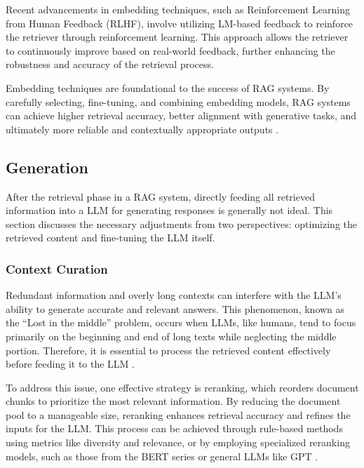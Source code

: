 Recent advancements in embedding techniques, such as Reinforcement Learning from Human Feedback (RLHF), involve utilizing LM-based feedback to reinforce the retriever through reinforcement learning. This approach allows the retriever to continuously improve based on real-world feedback, further enhancing the robustness and accuracy of the retrieval process.

Embedding techniques are foundational to the success of RAG systems. By carefully selecting, fine-tuning, and combining embedding models, RAG systems can achieve higher retrieval accuracy, better alignment with generative tasks, and ultimately more reliable and contextually appropriate outputs \cite{gao2023retrieval}.

\subsection{Generation}

After the retrieval phase in a RAG system, directly feeding all retrieved information into a LLM for generating responses is generally not ideal. This section discusses the necessary adjustments from two perspectives: optimizing the retrieved content and fine-tuning the LLM itself.

\subsubsection{Context Curation}

Redundant information and overly long contexts can interfere with the LLM’s ability to generate accurate and relevant answers. This phenomenon, known as the “Lost in the middle” problem, occurs when LLMs, like humans, tend to focus primarily on the beginning and end of long texts while neglecting the middle portion. Therefore, it is essential to process the retrieved content effectively before feeding it to the LLM \cite{liu2024lost}.

To address this issue, one effective strategy is reranking, which reorders document chunks to prioritize the most relevant information. By reducing the document pool to a manageable size, reranking enhances retrieval accuracy and refines the inputs for the LLM. This process can be achieved through rule-based methods using metrics like diversity and relevance, or by employing specialized reranking models, such as those from the BERT series or general LLMs like GPT \cite{gao2023chat}.

